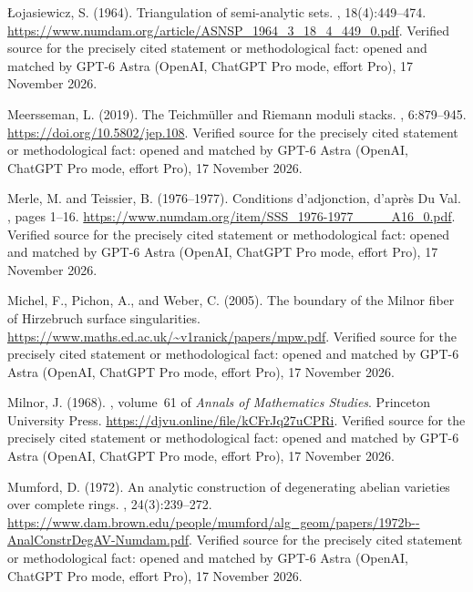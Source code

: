 \begin{thebibliography}{}
{\L}ojasiewicz, S. (1964).
\newblock Triangulation of semi-analytic sets.
, 18(4):449--474.
\newblock \url{https://www.numdam.org/article/ASNSP_1964_3_18_4_449_0.pdf}. Verified source for the precisely cited statement or methodological fact: opened and matched by GPT-6 Astra (OpenAI, ChatGPT Pro mode, effort Pro), 17 November 2026.

Meersseman, L. (2019).
\newblock The {Teichm\"uller} and {Riemann} moduli stacks.
,
  6:879--945.
\newblock \url{https://doi.org/10.5802/jep.108}. Verified source for the precisely cited statement or methodological fact: opened and matched by GPT-6 Astra (OpenAI, ChatGPT Pro mode, effort Pro), 17 November 2026.

Merle, M. and Teissier, B. (1976--1977).
\newblock Conditions d'adjonction, d'apr\`es {Du Val}.
, pages 1--16.
\newblock \url{https://www.numdam.org/item/SSS_1976-1977____A16_0.pdf}. Verified source for the precisely cited statement or methodological fact: opened and matched by GPT-6 Astra (OpenAI, ChatGPT Pro mode, effort Pro), 17 November 2026.

Michel, F., Pichon, A., and Weber, C. (2005).
\newblock The boundary of the {Milnor} fiber of {Hirzebruch} surface
  singularities.
\newblock \url{https://www.maths.ed.ac.uk/~v1ranick/papers/mpw.pdf}. Verified source for the precisely cited statement or methodological fact: opened and matched by GPT-6 Astra (OpenAI, ChatGPT Pro mode, effort Pro), 17 November 2026.

Milnor, J. (1968).
, volume~61 of {\em
  Annals of Mathematics Studies}.
\newblock Princeton University Press.
\newblock \url{https://djvu.online/file/kCFrJq27uCPRi}. Verified source for the precisely cited statement or methodological fact: opened and matched by GPT-6 Astra (OpenAI, ChatGPT Pro mode, effort Pro), 17 November 2026.

Mumford, D. (1972).
\newblock An analytic construction of degenerating abelian varieties over
  complete rings.
, 24(3):239--272.
\newblock \url{https://www.dam.brown.edu/people/mumford/alg_geom/papers/1972b--AnalConstrDegAV-Numdam.pdf}. Verified source for the precisely cited statement or methodological fact: opened and matched by GPT-6 Astra (OpenAI, ChatGPT Pro mode, effort Pro), 17 November 2026.


\end{thebibliography}
